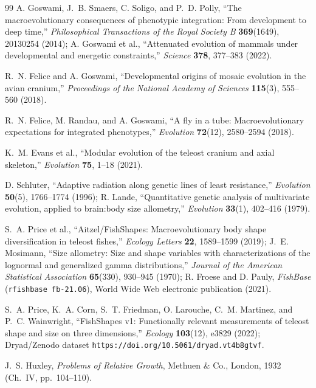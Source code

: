 \documentclass[11pt,a4paper]{article}
\theoremstyle{definition}
\theoremstyle{remark}
\begin{document}
\begin{thebibliography}{99}
A. Goswami, J.~B. Smaers, C. Soligo, and P.~D. Polly, ``The macroevolutionary consequences of phenotypic integration: From development to deep time,'' \emph{Philosophical Transactions of the Royal Society B} \textbf{369}(1649), 20130254 (2014); A. Goswami et al., ``Attenuated evolution of mammals under developmental and energetic constraints,'' \emph{Science} \textbf{378}, 377--383 (2022).

R.~N. Felice and A. Goswami, ``Developmental origins of mosaic evolution in the avian cranium,'' \emph{Proceedings of the National Academy of Sciences} \textbf{115}(3), 555--560 (2018).

R.~N. Felice, M. Randau, and A. Goswami, ``A fly in a tube: Macroevolutionary expectations for integrated phenotypes,'' \emph{Evolution} \textbf{72}(12), 2580--2594 (2018).

K.~M. Evans et al., ``Modular evolution of the teleost cranium and axial skeleton,'' \emph{Evolution} \textbf{75}, 1--18 (2021).

D. Schluter, ``Adaptive radiation along genetic lines of least resistance,'' \emph{Evolution} \textbf{50}(5), 1766--1774 (1996); R. Lande, ``Quantitative genetic analysis of multivariate evolution, applied to brain:body size allometry,'' \emph{Evolution} \textbf{33}(1), 402--416 (1979).

S.~A. Price et al., ``Aitzel/FishShapes: Macroevolutionary body shape diversification in teleost fishes,'' \emph{Ecology Letters} \textbf{22}, 1589--1599 (2019); J.~E. Mosimann, ``Size allometry: Size and shape variables with characterizations of the lognormal and generalized gamma distributions,'' \emph{Journal of the American Statistical Association} \textbf{65}(330), 930--945 (1970); R. Froese and D. Pauly, \emph{FishBase} (\texttt{rfishbase fb-21.06}), World Wide Web electronic publication (2021).

S.~A. Price, K.~A. Corn, S.~T. Friedman, O. Larouche, C.~M. Martinez, and P.~C. Wainwright, ``FishShapes v1: Functionally relevant measurements of teleost shape and size on three dimensions,'' \emph{Ecology} \textbf{103}(12), e3829 (2022); Dryad/Zenodo dataset \texttt{https://doi.org/10.5061/dryad.vt4b8gtvf}.

J.~S. Huxley, \emph{Problems of Relative Growth}, Methuen \& Co., London, 1932 (Ch.\ IV, pp.\ 104--110).


\end{thebibliography}
\end{document}
